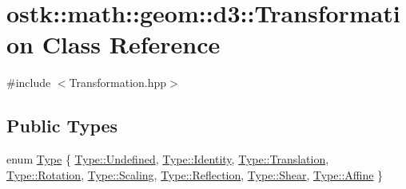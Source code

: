 \hypertarget{classostk_1_1math_1_1geom_1_1d3_1_1_transformation}{}\section{ostk\+:\+:math\+:\+:geom\+:\+:d3\+:\+:Transformation Class Reference}
\label{classostk_1_1math_1_1geom_1_1d3_1_1_transformation}


{\ttfamily \#include $<$Transformation.\+hpp$>$}

\subsection*{Public Types}
\begin{DoxyCompactItemize}
\item 
enum \hyperlink{classostk_1_1math_1_1geom_1_1d3_1_1_transformation_a04794da018108a1e973dad364c32b4ec}{Type} \{ \newline
\hyperlink{classostk_1_1math_1_1geom_1_1d3_1_1_transformation_a04794da018108a1e973dad364c32b4ecaec0fc0100c4fc1ce4eea230c3dc10360}{Type\+::\+Undefined}, 
\hyperlink{classostk_1_1math_1_1geom_1_1d3_1_1_transformation_a04794da018108a1e973dad364c32b4ecac9c5c65fb4af9cf90eb99b3b84424189}{Type\+::\+Identity}, 
\hyperlink{classostk_1_1math_1_1geom_1_1d3_1_1_transformation_a04794da018108a1e973dad364c32b4eca6dd08874f83507e9c7b23f1a46b7fa7c}{Type\+::\+Translation}, 
\hyperlink{classostk_1_1math_1_1geom_1_1d3_1_1_transformation_a04794da018108a1e973dad364c32b4ecaf1a42bd417390fc63b030a519624607a}{Type\+::\+Rotation}, 
\newline
\hyperlink{classostk_1_1math_1_1geom_1_1d3_1_1_transformation_a04794da018108a1e973dad364c32b4ecabc967dc2d57e6eff184a821bf7577a80}{Type\+::\+Scaling}, 
\hyperlink{classostk_1_1math_1_1geom_1_1d3_1_1_transformation_a04794da018108a1e973dad364c32b4ecaaea1e492943ccbad7ee270ec1e064758}{Type\+::\+Reflection}, 
\hyperlink{classostk_1_1math_1_1geom_1_1d3_1_1_transformation_a04794da018108a1e973dad364c32b4eca02414922b70cc0f9d7c841b0c70a0f94}{Type\+::\+Shear}, 
\hyperlink{classostk_1_1math_1_1geom_1_1d3_1_1_transformation_a04794da018108a1e973dad364c32b4eca5b525aab6e200981a842101f1bcbafc6}{Type\+::\+Affine}
 \}
\end{DoxyCompactItemize}
